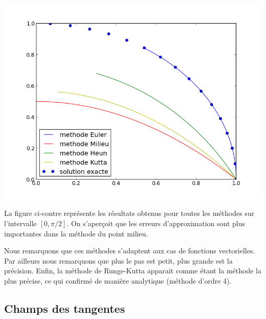 \begin{minipage}{0.4\textwidth}
\includegraphics[scale = 0.4]{d2.png}
\label{elipse}
\end{minipage} \hfill
\begin{minipage}{0.45\textwidth}
La figure ci-contre représente les résultats obtenus pour toutes les méthodes sur l'intervalle $[0,\pi/2]$. On s'aperçoit que les erreurs d'approximation sont plus importantes dans la méthode du point milieu.
\end{minipage}

Nous remarquons que ces méthodes s'adaptent aux cas de fonctions vectorielles.
Par ailleurs nous remarquons que plus le pas est petit, plus grande est la précision.
Enfin, la méthode de Runge-Kutta apparait comme étant la méthode la plus précise, ce qui confirmé de manière analytique (méthode d'ordre 4).


\subsection{Champs des tangentes}


